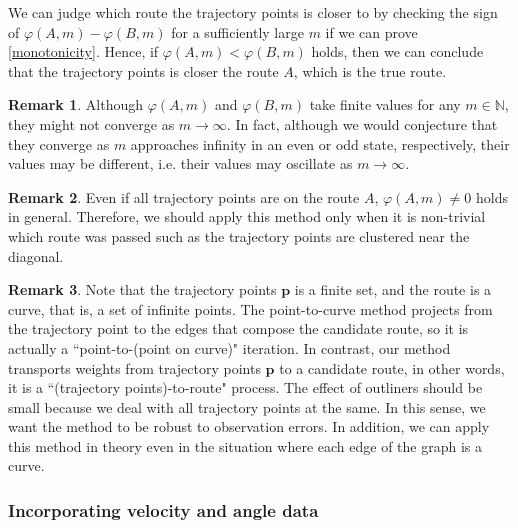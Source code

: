 \documentclass{article}
\numberwithin{equation}{section}
\theoremstyle{definition}
\newtheorem{remark}[remark]{Remark}
\newcommand{\N}{\mathbb{N}}
\begin{document}
We can judge which route the trajectory points is closer to by checking the sign of $\varphi(A,m)-\varphi(B,m)$ for a sufficiently large $m$ if we can prove \autoref{monotonicity}.
Hence, if $\varphi(A,m)<\varphi(B,m)$ holds, then we can conclude that the trajectory points is closer the route $A$, which is the true route.

\begin{remark}
Although $\varphi(A,m)$ and $\varphi(B,m)$ take finite values for any $m\in\N$, they might not converge as $m\to\infty$.
In fact, although we would conjecture that they converge as $m$ approaches infinity in an even or odd state, respectively, their values may be different, i.e. their values may oscillate as $m\to\infty$.
\end{remark}

\begin{remark}
Even if all trajectory points are on the route $A$, $\varphi(A,m)\neq0$ holds in general.
Therefore, we should apply this method only when it is non-trivial which route was passed such as the trajectory points are clustered near the diagonal.
\end{remark}

\begin{remark}
Note that the trajectory points $\mathbf{p}$ is a finite set, and the route is a curve, that is, a set of infinite points.
The point-to-curve method projects from the trajectory point to the edges that compose the candidate route, so it is actually a ``point-to-(point on curve)" iteration.
In contrast, our method transports weights from trajectory points $\mathbf{p}$ to a candidate route, in other words, it is a ``(trajectory  points)-to-route" process.
The effect of outliners should be small because we deal with all trajectory points at the same.
In this sense, we want the method to be robust to observation errors.
In addition, we can apply this method in theory even in the situation where each edge of the graph is a curve.
\end{remark}


\subsubsection*{Incorporating velocity and angle data}
\end{document}

